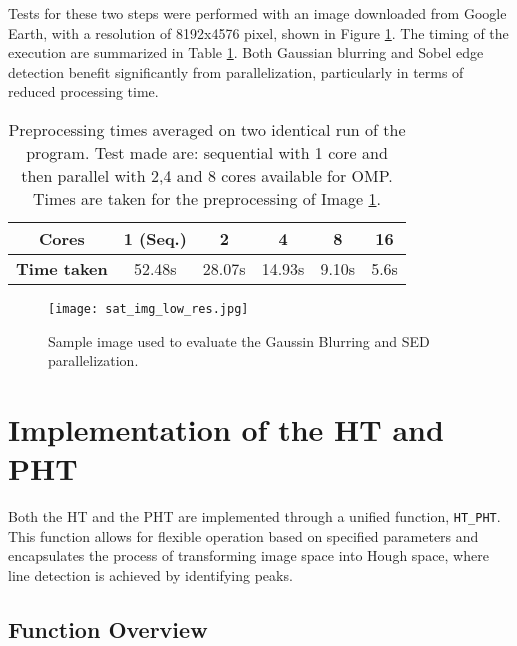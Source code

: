 \documentclass[conference]{IEEEtran}
\begin{document}
        Tests for these two steps were performed with an image downloaded from Google Earth, with a resolution of 8192x4576 pixel, shown in Figure \ref{fig:sat_gb_sed}. The timing of the execution are summarized in Table \ref{tab:preprocessing_time}. Both Gaussian blurring and Sobel edge detection benefit significantly from parallelization, particularly in terms of reduced processing time.

        \begin{table}[htbp]
            \centering
            \begin{tabular}{|c|c|c|c|c|c|}
            \hline
            \textbf{Cores} & 1 (Seq.) & 2 & 4 & 8 & 16\\
            \hline
            \textbf{Time taken} & 52.48s & 28.07s & 14.93s & 9.10s & 5.6s \\
            \hline
            \end{tabular}
            \caption{Preprocessing times averaged on two identical run of the program. Test made are: sequential with 1 core and then parallel with 2,4 and 8 cores available for OMP. Times are taken for the preprocessing of Image \ref{fig:sat_gb_sed}.}
            \label{tab:preprocessing_time}
        \end{table}

        \begin{figure}[htbp]
            \centering
            \texttt{[image: sat\_img\_low\_res.jpg]}
            \caption{Sample image used to evaluate the Gaussin Blurring and SED parallelization.}
            \label{fig:sat_gb_sed}
        \end{figure}

\section{Implementation of the HT and PHT}
\label{sec:ht_pht_impl}
    
    Both the HT and the PHT are implemented through a unified function, \texttt{HT\_PHT}. This function allows for flexible operation based on specified parameters and encapsulates the process of transforming image space into Hough space, where line detection is achieved by identifying peaks.

    \subsection{Function Overview}
    \label{subsec:function_overview}
        
\end{document}
